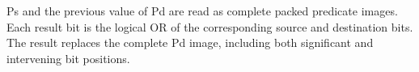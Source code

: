 Ps and the previous value of Pd are read as complete packed predicate images.
Each result bit is the logical OR of the corresponding source and destination
bits.  The result replaces the complete Pd image, including both significant
and intervening bit positions.
